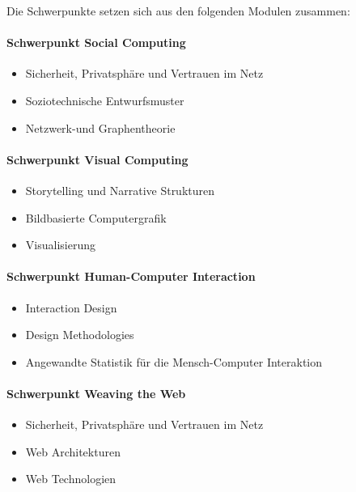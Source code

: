 Die Schwerpunkte setzen sich aus den folgenden Modulen zusammen:

\paragraph{Schwerpunkt Social
Computing}\label{schwerpunkt-social-computing}

\begin{itemize}
\tightlist
\item
  Sicherheit, Privatsphäre und Vertrauen im Netz
\item
  Soziotechnische Entwurfsmuster
\item
  Netzwerk-und Graphentheorie
\end{itemize}

\paragraph{Schwerpunkt Visual
Computing}\label{schwerpunkt-visual-computing}

\begin{itemize}
\tightlist
\item
  Storytelling und Narrative Strukturen
\item
  Bildbasierte Computergrafik
\item
  Visualisierung
\end{itemize}

\paragraph{Schwerpunkt Human-Computer
Interaction}\label{schwerpunkt-human-computer-interaction}

\begin{itemize}
\tightlist
\item
  Interaction Design
\item
  Design Methodologies
\item
  Angewandte Statistik für die Mensch-Computer Interaktion
\end{itemize}

\paragraph{Schwerpunkt Weaving the
Web}\label{schwerpunkt-weaving-the-web}

\begin{itemize}
\tightlist
\item
  Sicherheit, Privatsphäre und Vertrauen im Netz
\item
  Web Architekturen
\item
  Web Technologien
\end{itemize}

